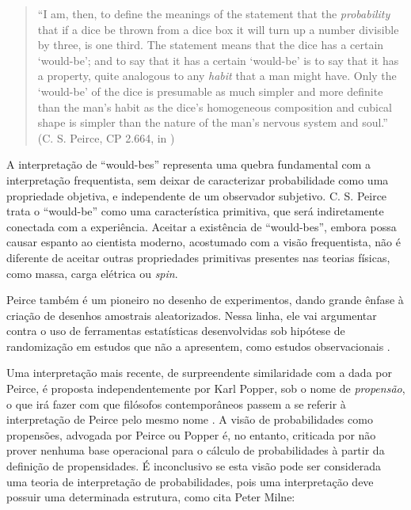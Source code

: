 \begin{quote}
``I am, then, to define the meanings of the statement that the {\em probability} that if a dice be thrown from a dice
box it will turn up a number divisible by three, is one third. The statement means that the dice has a certain `would-be';
and to say that it has a certain `would-be' is to say that it has a property, quite analogous to any {\em habit} that a man
might have. Only the `would-be' of the dice is presumable as much simpler and more definite than the man's habit as the
dice's homogeneous composition and cubical shape is simpler than the nature of the man's nervous system and soul.''
(C. S. Peirce, CP 2.664, in \citep{Fetzer93})
\end{quote}

A interpretação de ``would-bes'' representa uma quebra fundamental com a interpretação frequentista, sem deixar de caracterizar
probabilidade como uma propriedade objetiva, e independente de um observador subjetivo. C. S. Peirce trata o ``would-be'' como
uma característica primitiva, que será indiretamente conectada com a experiência. Aceitar a existência de ``would-bes'', 
embora possa causar espanto ao cientista moderno, acostumado com a visão 
frequentista, não é diferente de aceitar outras propriedades
primitivas presentes nas teorias físicas, como massa, carga elétrica
ou {\em spin}.

Peirce também é um pioneiro no desenho de experimentos, dando grande ênfase à criação de desenhos amostrais aleatorizados.
Nessa linha, ele vai argumentar contra o uso de ferramentas estatísticas desenvolvidas sob
hipótese de randomização em estudos que não a apresentem, como estudos observacionais \citep{Stigler78}.

Uma interpretação mais recente, de surpreendente similaridade com a dada por Peirce, é proposta independentemente por Karl Popper, sob o nome
de {\em propensão}, o que irá fazer com que filósofos contemporâneos passem a se referir à interpretação de Peirce pelo mesmo
nome \citep{Miller75}.
A visão de probabilidades como propensões, advogada por Peirce ou Popper é, 
no entanto, criticada por não prover nenhuma base operacional para o cálculo de probabilidades à partir
da definição de propensidades. É inconclusivo se esta visão pode ser considerada uma teoria de interpretação
de probabilidades, pois uma interpretação deve possuir uma determinada estrutura, como cita Peter Milne:

